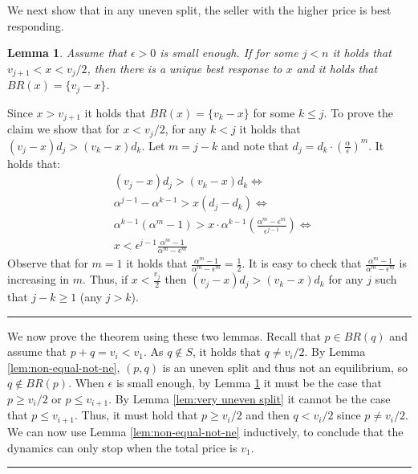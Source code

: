 \documentclass[11pt,a4paper]{article}
\newcommand{\qed}{\rule{1.5mm}{2mm}\vspace{0.1in}}
\newenvironment{proof}{\par\noindent{\bf Proof:}}{\qed}
\newtheorem{lemma}[theorem]{Lemma}
\begin{document}
\begin{proof}
 	We next show that in any uneven split, the seller with the higher price is best responding.
	\begin{lemma}
		\label{lem:non-equal-high-stays}
		Assume that $\epsilon>0$ is small enough.
		If for some $j<n$ it holds that $v_{j+1}<x<v_j/2$, then there is a unique best response to $x$ and it holds that  $BR(x)=\{v_j-x\}$.
	\end{lemma}
	\begin{proof}
		Since $x>v_{j+1}$ it holds that $BR(x)=\{v_k-x\}$ for some $k\leq j$.
		To prove the claim we show that for $x<v_j/2$, for any $k<j$ it holds that $(v_{j}-x)d_{j}> (v_{k}-x)d_{k}$.
		Let $m=j-k$ and note that $d_j=d_k \cdot \left(\frac{\alpha}{\epsilon}\right)^{m}$. It holds that:
		\begin{align*}	
		& (v_{j}-x)d_{j}> (v_{k}-x)d_{k} \Leftrightarrow  \\
		& \alpha^{j-1} - \alpha^{k-1} >x(d_j-d_k)\Leftrightarrow\\
		& \alpha^{k-1} (\alpha^m -1 )> x\cdot \alpha^{k-1} \left(\frac{\alpha^m-\epsilon^m}{\epsilon^{j-1}}\right)\Leftrightarrow\\
		& x< \epsilon^{j-1} \frac{\alpha^m -1}{\alpha^m -\epsilon^m} %
		\end{align*}
		Observe that for $m=1$ it holds that $\frac{\alpha^m -1}{\alpha^m -\epsilon^m}=\frac{1}{2}$. It is easy to check that
		$\frac{\alpha^m -1}{\alpha^m -\epsilon^m}$ is increasing in $m$. Thus, if $x<\frac{v_j}{2}$ then
		$(v_{j}-x)d_{j}> (v_{k}-x)d_{k}$ for any $j$ such that $j-k\geq 1$ (any $j>k$).
	\end{proof}
	
	We now prove the theorem using these two lemmas.
	Recall that $p\in BR(q)$ and assume that $p+q=v_i<v_1$. As $q\notin S$, it holds that $q\neq v_i/2$. By Lemma \ref{lem:non-equal-not-ne},
	$(p,q)$ is an uneven split and thus not an equilibrium, so $q\notin BR(p)$. When $\epsilon$ is small enough, by Lemma \ref{lem:non-equal-high-stays} it must be the case that $p\geq v_i/2$ or $p\leq v_{i+1}$.
	By Lemma \ref{lem:very uneven split} it cannot be the case that $p\leq v_{i+1}$.
	Thus, it must hold that $p\geq v_i/2$ and then $q<v_i/2$ since $p\neq v_i/2$. We can now use Lemma \ref{lem:non-equal-not-ne} inductively, to conclude that the dynamics can only stop when the total price is $v_1$.
	

\end{proof}
\end{document}
